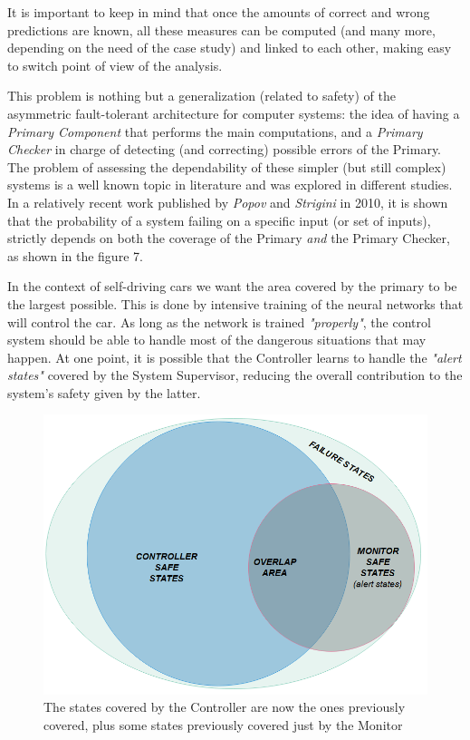 It is important to keep in mind that once the amounts of correct and wrong predictions are known, all these measures can be computed (and many more, depending on the need of the case study) and linked to each other, making easy to switch point of view of the analysis.\newline

This problem is nothing but a generalization (related to safety) of the asymmetric fault-tolerant architecture for computer systems: the idea of having a \textsl{Primary Component} that performs the main computations, and a \textsl{Primary Checker} in charge of detecting (and correcting) possible errors of the Primary.\newline
The problem of assessing the dependability of these simpler (but still complex) systems is a well known topic in literature and was explored in different studies. In a relatively recent work published by \textsl{Popov} and \textsl{Strigini} in 2010, it is shown that the probability of a system failing on a specific input (or set of inputs), strictly depends on both the coverage of the Primary \textsl{and} the Primary Checker, as shown in the figure 7.\cite{striginiPopov}

In the context of self-driving cars we want the area covered by the primary to be the largest possible. This is done by intensive training of the neural networks that will control the car. As long as the network is trained \textsl{"properly"}, the control system should be able to handle most of the dangerous situations that may happen. At one point, it is possible that the Controller learns to handle the \textsl{"alert states"} covered by the System Supervisor, reducing the overall contribution to the system's safety given by the latter.

\begin{figure}[h!]
	\includegraphics[width=\textwidth]{img/area-growth-good.png}
	\caption{The states covered by the Controller are now the ones previously covered, plus some states previously covered just by the Monitor}
\end{figure}

